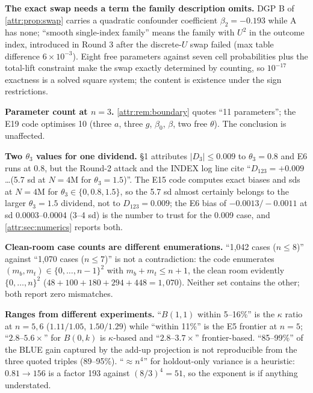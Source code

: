 \begin{reviewernote}[(compiler)]
\textbf{The exact swap needs a term the family description omits.} DGP B of \cref{attr:prop:swap} carries a quadratic confounder coefficient $\beta_2 = -0.193$ while A has none; ``smooth single-index family'' means the family with $U^2$ in the outcome index, introduced in Round 3 after the discrete-$U$ swap failed (max table difference $6\times10^{-3}$). Eight free parameters against seven cell probabilities plus the total-lift constraint make the swap exactly determined by counting, so $10^{-17}$ exactness is a solved square system; the content is existence under the sign restrictions.

\textbf{Parameter count at $n = 3$.} \cref{attr:rem:boundary} quotes ``11 parameters''; the E19 code optimises 10 (three $a$, three $g$, $\beta_0$, $\beta$, two free $\theta$). The conclusion is unaffected.

\textbf{Two $\theta_3$ values for one dividend.}  \S1 attributes $|D_3| \le 0.009$ to $\theta_3 = 0.8$ and E6 runs at 0.8, but the Round-2 attack and the INDEX log line cite ``$D_{123} = +0.009$ \ldots (5.7 sd at $N = 4$M for $\theta_3 = 1.5$)''. The E15 code computes exact biases and sds at $N = 4$M for $\theta_3 \in \{0, 0.8, 1.5\}$, so the 5.7 sd almost certainly belongs to the larger $\theta_3 = 1.5$ dividend, not to $D_{123} = 0.009$; the E6 bias of $-0.0013/-0.0011$ at sd 0.0003--0.0004 (3--4 sd) is the number to trust for the 0.009 case, and \cref{attr:sec:numerics} reports both.

\textbf{Clean-room case counts are different enumerations.} ``1,042 cases ($n \le 8$)'' against ``1,070 cases ($n \le 7$)'' is not a contradiction: the code enumerates $(m_b, m_t) \in \{0, \ldots, n-1\}^2$ with $m_b + m_t \le n + 1$, the clean room evidently $\{0, \ldots, n\}^2$ ($48 + 100 + 180 + 294 + 448 = 1{,}070$). Neither set contains the other; both report zero mismatches.

\textbf{Ranges from different experiments.} ``$B(1,1)$ within 5--16\%'' is the $\kappa$ ratio at $n = 5, 6$ ($1.11/1.05$, $1.50/1.29$) while ``within 11\%'' is the E5 frontier at $n = 5$; ``$2.8$--$5.6\times$'' for $B(0,k)$ is $\kappa$-based and ``$2.8$--$3.7\times$'' frontier-based. ``85--99\%'' of the BLUE gain captured by the add-up projection is not reproducible from the three quoted triples (89--95\%). ``$\approx n^4$'' for holdout-only variance is a heuristic: $0.81 \to 156$ is a factor 193 against $(8/3)^4 = 51$, so the exponent is if anything understated.


\end{reviewernote}
